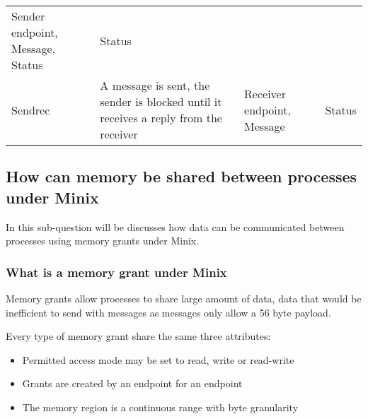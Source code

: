 \begin{longtable}[]{@{}llll@{}}
\begin{minipage}[t]{0.30\columnwidth}
Sender endpoint, Message, Status\strut
\end{minipage} & \begin{minipage}[t]{0.25\columnwidth}\raggedright
Status\strut
\end{minipage}\tabularnewline
\begin{minipage}[t]{0.11\columnwidth}\raggedright
Sendrec\strut
\end{minipage} & \begin{minipage}[t]{0.23\columnwidth}\raggedright
A message is sent, the sender is blocked until it receives a reply from
the receiver\strut
\end{minipage} & \begin{minipage}[t]{0.30\columnwidth}\raggedright
Receiver endpoint, Message\strut
\end{minipage} & \begin{minipage}[t]{0.25\columnwidth}\raggedright
Status\strut
\end{minipage}\tabularnewline
\bottomrule
\end{longtable}

\hypertarget{how-can-memory-be-shared-between-processes-under-minix}{%
\subsection{How can memory be shared between processes under
Minix}\label{how-can-memory-be-shared-between-processes-under-minix}}

In this sub-question will be discusses how data can be communicated
between processes using memory grants under Minix.

\hypertarget{what-is-a-memory-grant-under-minix}{%
\subsubsection{What is a memory grant under
Minix}\label{what-is-a-memory-grant-under-minix}}

Memory grants allow processes to share large amount of data, data that
would be inefficient to send with messages as messages only allow a 56
byte payload.

Every type of memory grant share the same three attributes:

\begin{itemize}
\tightlist
\item
  Permitted access mode may be set to read, write or read-write
\item
  Grants are created by an endpoint for an endpoint
\item
  The memory region is a continuous range with byte granularity
\end{itemize}

